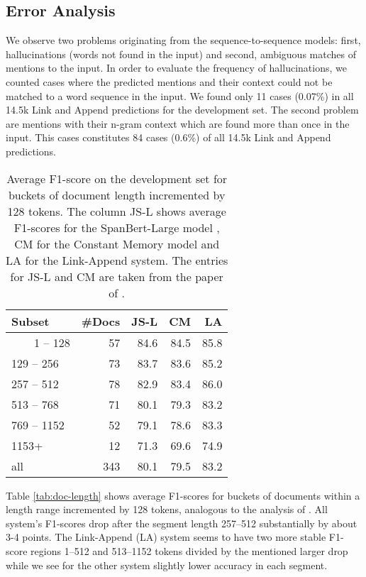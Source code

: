 \documentclass[11pt,a4paper]{article}
\begin{document}
\subsection{Error Analysis}
\label{sec:error-analysis}

We observe two problems originating from the sequence-to-sequence models: first, hallucinations (words not found in the input) and second, ambiguous matches of mentions to the input. In order to evaluate the frequency of hallucinations, we counted cases where the predicted mentions and their context  could not be matched to a word sequence in the input. We found only 11 cases (0.07\%) in all 14.5k Link and Append predictions for the development set. 
The second problem are mentions with their n-gram context which are found more than once in the input. This cases constitutes 84 cases (0.6\%) of all 14.5k Link and Append predictions.

\begin{table}[h]
    \centering
    \small
    \begin{tabular}{l|r|r|r|r }
        Subset   & \#Docs & JS-L & CM &LA \\ \hline
        ~~~~1 -- 128  &  57 & 84.6 & 84.5 & 85.8 \\
        129 -- 256 & 73 & 83.7 & 83.6 & 85.2 \\
        257 -- 512 & 78 & 82.9 & 83.4 & 86.0 \\
        513 -- 768 & 71 & 80.1 & 79.3 & 83.2 \\
        769 -- 1152 & 52 & 79.1 & 78.6 & 83.3 \\
        1153+   & 12 & 71.3 & 69.6 & 74.9 \\ \hline
        all      & 343  & 80.1 &    79.5  &83.2 \\ 
         
    \end{tabular}
    \caption{Average F1-score on the development set for buckets of document length incremented by 128 tokens. The column JS-L shows average F1-scores for the SpanBert-Large model \cite{joshi-etal-2020-spanbert}, CM for the Constant Memory model \cite{xia-etal-2020-incremental} and LA for the Link-Append system.  The entries for JS-L and CM are taken from the paper of . 
    \label{tab:doc-length}}
    \label{tab:my_label}
\end{table}

Table \ref{tab:doc-length} shows average F1-scores
 for buckets of documents within a length range  incremented by 128 tokens, analogous to the analysis of . All system's F1-scores drop after the segment length 257--512 substantially by about 3-4 points. The Link-Append (LA) system  seems to have two more stable F1-score regions 1--512 and 513--1152 tokens divided by the mentioned larger drop while we see for the other system slightly lower accuracy in each segment.   
\end{document}
